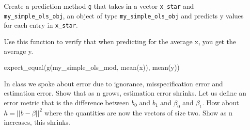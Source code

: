 \documentclass[
]{article}
\newenvironment{Shaded}{\begin{snugshade}}{\end{snugshade}}
\newcommand{\ControlFlowTok}[1]{\textcolor[rgb]{0.13,0.29,0.53}{\textbf{#1}}}
\newcommand{\FunctionTok}[1]{\textcolor[rgb]{0.00,0.00,0.00}{#1}}
\newcommand{\NormalTok}[1]{#1}
\newcommand{\OtherTok}[1]{\textcolor[rgb]{0.56,0.35,0.01}{#1}}
\newcommand{\SpecialCharTok}[1]{\textcolor[rgb]{0.00,0.00,0.00}{#1}}
\begin{document}
Create a prediction method \texttt{g} that takes in a vector
\texttt{x\_star} and \texttt{my\_simple\_ols\_obj}, an object of type
\texttt{my\_simple\_ols\_obj} and predicts y values for each entry in
\texttt{x\_star}.

\begin{Shaded}
\end{Shaded}

Use this function to verify that when predicting for the average x, you
get the average y.

\begin{Shaded}
\begin{Highlighting}[]
\FunctionTok{expect\_equal}\NormalTok{(}\FunctionTok{g}\NormalTok{(my\_simple\_ols\_mod, }\FunctionTok{mean}\NormalTok{(x)), }\FunctionTok{mean}\NormalTok{(y))}
\end{Highlighting}
\end{Shaded}

In class we spoke about error due to ignorance, misspecification error
and estimation error. Show that as n grows, estimation error shrinks.
Let us define an error metric that is the difference between \(b_0\) and
\(b_1\) and \(\beta_0\) and \(\beta_1\). How about
\(h = ||b - \beta||^2\) where the quantities are now the vectors of size
two. Show as n increases, this shrinks.
\end{document}
